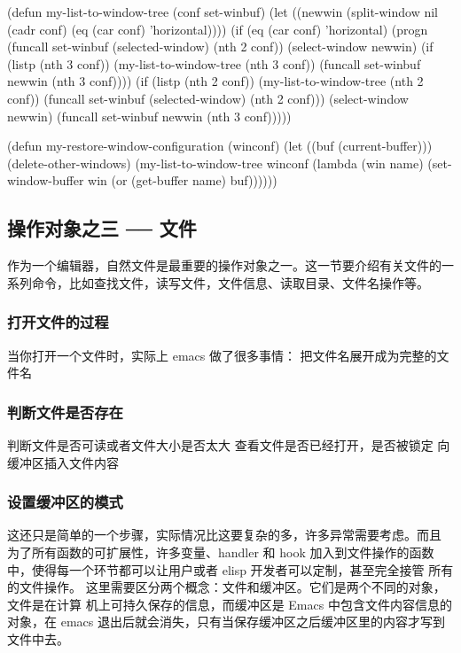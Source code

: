 \documentclass[11pt]{ctexart}
\begin{document}
{{{{(defun my-list-to-window-tree (conf set-winbuf)
(let ((newwin (split-window nil (cadr conf)
(eq (car conf) 'horizontal))))
(if (eq (car conf) 'horizontal)
(progn
(funcall set-winbuf (selected-window) (nth 2 conf))
(select-window newwin)
(if (listp (nth 3 conf))
(my-list-to-window-tree (nth 3 conf))
(funcall set-winbuf newwin (nth 3 conf))))
(if (listp (nth 2 conf))
(my-list-to-window-tree (nth 2 conf))
(funcall set-winbuf (selected-window) (nth 2 conf)))
(select-window newwin)
(funcall set-winbuf newwin (nth 3 conf)))))

(defun my-restore-window-configuration (winconf)
(let ((buf (current-buffer)))
(delete-other-windows)
(my-list-to-window-tree winconf
(lambda (win name)
(set-window-buffer win (or (get-buffer name)
buf))))))
\subsection{操作对象之三 ── 文件}
\label{sec:orgbd27f65}

作为一个编辑器，自然文件是最重要的操作对象之一。这一节要介绍有关文件的一系列命令，比如查找文件，读写文件，文件信息、读取目录、文件名操作等。
\subsubsection{打开文件的过程}
\label{sec:orgae74bf3}
当你打开一个文件时，实际上 emacs 做了很多事情：
把文件名展开成为完整的文件名
\subsubsection{判断文件是否存在}
\label{sec:org3214539}
判断文件是否可读或者文件大小是否太大
查看文件是否已经打开，是否被锁定
向缓冲区插入文件内容
\subsubsection{设置缓冲区的模式}
\label{sec:org23765d9}
这还只是简单的一个步骤，实际情况比这要复杂的多，许多异常需要考虑。而且 为了所有函数的可扩展性，许多变量、handler 和 hook 加入到文件操作的函数 中，使得每一个环节都可以让用户或者 elisp 开发者可以定制，甚至完全接管 所有的文件操作。
这里需要区分两个概念：文件和缓冲区。它们是两个不同的对象，文件是在计算 机上可持久保存的信息，而缓冲区是 Emacs 中包含文件内容信息的对象，在 emacs 退出后就会消失，只有当保存缓冲区之后缓冲区里的内容才写到文件中去。
}}}}
\end{document}
